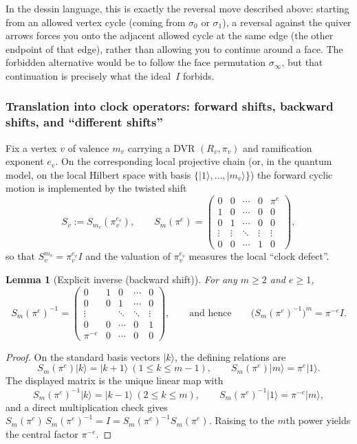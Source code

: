 \documentclass[11pt,oneside]{amsbook}
\numberwithin{equation}{section}
\theoremstyle{plain}
\newtheorem{lemma}[theorem]{Lemma}
\theoremstyle{definition}
\theoremstyle{remark}
\newcommand{\ket}[1]{\lvert #1 \rangle}
\begin{document}
\begin{enumerate}
In the dessin language, this is exactly the reversal move described above:
starting from an allowed vertex cycle (coming from $\sigma_0$ or $\sigma_1$), a reversal against the quiver arrows forces you onto the
adjacent allowed cycle at the same edge (the other endpoint of that edge), rather than allowing you to continue around a face.
The forbidden alternative would be to follow the face permutation $\sigma_\infty$, but that continuation is precisely what the ideal~$I$ forbids.

\subsubsection{Translation into clock operators: forward shifts, backward shifts, and ``different shifts''}

Fix a vertex $v$ of valence $m_v$ carrying a DVR $(R_v,\pi_v)$ and ramification exponent $e_v$.
On the corresponding local projective chain (or, in the quantum model, on the local Hilbert space with basis $\{\ket{1},\dots,\ket{m_v}\}$)
the forward cyclic motion is implemented by the twisted shift
\[
S_v:=S_{m_v}(\pi_v^{e_v}),
\qquad
S_{m}(\pi^e)=
\begin{pmatrix}
0 & 0 & \cdots & 0 & \pi^e\\
1 & 0 & \cdots & 0 & 0\\
0 & 1 & \cdots & 0 & 0\\
\vdots & \vdots & \ddots & \vdots & \vdots\\
0 & 0 & \cdots & 1 & 0
\end{pmatrix},
\]
so that $S_v^{m_v}=\pi_v^{e_v}I$ and the valuation of $\pi_v^{e_v}$ measures the local ``clock defect''.

\begin{lemma}[Explicit inverse (backward shift)]
\label{lem:twisted_shift_inverse}
For any $m\ge 2$ and $e\ge 1$,
\[
S_m(\pi^e)^{-1}=
\begin{pmatrix}
0 & 1 & 0 & \cdots & 0\\
0 & 0 & 1 & \cdots & 0\\
\vdots &  & \ddots & \ddots & \vdots\\
0 & 0 & \cdots & 0 & 1\\
\pi^{-e} & 0 & \cdots & 0 & 0
\end{pmatrix},
\qquad\text{and hence}\qquad
\bigl(S_m(\pi^e)^{-1}\bigr)^m=\pi^{-e}I.
\]
\end{lemma}

\begin{proof}
On the standard basis vectors $\ket{k}$, the defining relations are
\[
S_m(\pi^e)\ket{k}=\ket{k+1}\ (1\le k\le m-1),\qquad S_m(\pi^e)\ket{m}=\pi^e\ket{1}.
\]
The displayed matrix is the unique linear map with
\[
S_m(\pi^e)^{-1}\ket{k}=\ket{k-1}\ (2\le k\le m),\qquad S_m(\pi^e)^{-1}\ket{1}=\pi^{-e}\ket{m},
\]
and a direct multiplication check gives $S_m(\pi^e)\,S_m(\pi^e)^{-1}=I=S_m(\pi^e)^{-1}S_m(\pi^e)$.
Raising to the $m$th power yields the central factor $\pi^{-e}$.
\end{proof}


\end{enumerate}
\end{document}
